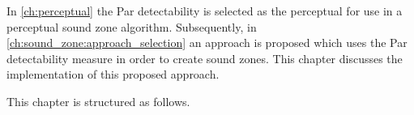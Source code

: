 In \autoref{ch:perceptual} the Par detectability is selected as the perceptual for use in a perceptual sound zone algorithm.
Subsequently, in \autoref{ch:sound_zone:approach_selection} an approach is proposed which uses the Par detectability measure in order
to create sound zones.
This chapter discusses the implementation of this proposed approach.

This chapter is structured as follows.
